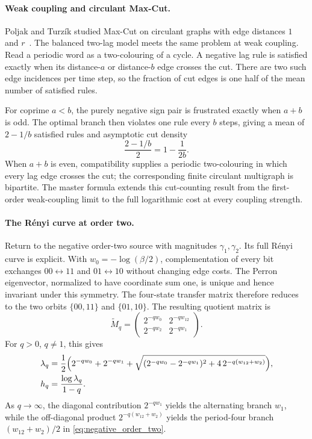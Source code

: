 \documentclass[11pt,a4paper]{article}
\begin{document}
\paragraph{Weak coupling and circulant Max-Cut.}
Poljak and Turz\'ik studied Max-Cut on circulant graphs with edge
distances $1$ and $r$~\cite{poljak1992max}.  The balanced two-lag model meets
the same problem at weak coupling.  Read a periodic word as a
two-colouring of a cycle.  A negative lag rule is satisfied exactly
when its distance-$a$ or distance-$b$ edge crosses the cut.  There are
two such edge incidences per time step, so the fraction of cut edges is
one half of the mean number of satisfied rules.

For coprime $a<b$, the purely negative sign pair is frustrated exactly
when $a+b$ is odd.  The optimal branch then violates one rule every
$b$ steps, giving a mean of $2-1/b$ satisfied rules and asymptotic cut
density
\[
    \frac{2-1/b}{2}=1-\frac{1}{2b}.
\]
When $a+b$ is even, compatibility supplies a periodic two-colouring in
which every lag edge crosses the cut; the corresponding finite
circulant multigraph is bipartite.  The master formula extends this
cut-counting result from the first-order weak-coupling limit to the
full logarithmic cost at every coupling strength.

\paragraph{The R\'enyi curve at order two.}
Return to the negative order-two source with magnitudes
$\gamma_1,\gamma_2$.  Its full R\'enyi curve is explicit.  With
$w_0=-\log(\beta/2)$, complementation of every bit exchanges
$00\leftrightarrow11$ and $01\leftrightarrow10$ without changing edge
costs.  The Perron eigenvector, normalized to have coordinate sum one, is
unique and hence invariant
under this symmetry.  The four-state transfer matrix therefore reduces
to the two orbits
$\{00,11\}$ and $\{01,10\}$.  The resulting quotient matrix is
\[
    \widetilde M_q=
    \begin{pmatrix}
        2^{-qw_0} & 2^{-qw_{12}}\\
        2^{-qw_2} & 2^{-qw_1}
    \end{pmatrix}.
\]
For $q>0$, $q\ne1$, this gives
\begin{align}
    \lambda_q
    &=\frac12\Bigl(
        2^{-qw_0}+2^{-qw_1}
        +\sqrt{(2^{-qw_0}-2^{-qw_1})^2
               +4\,2^{-q(w_{12}+w_2)}}
      \Bigr),
      \label{eq:order_two_renyi_root}\\
    h_q&=\frac{\log\lambda_q}{1-q}.
\end{align}
As $q\to\infty$, the diagonal contribution $2^{-qw_1}$ yields the
alternating branch $w_1$, while the off-diagonal product
$2^{-q(w_{12}+w_2)}$ yields the period-four branch
$(w_{12}+w_2)/2$ in \eqref{eq:negative_order_two}.
\end{document}
